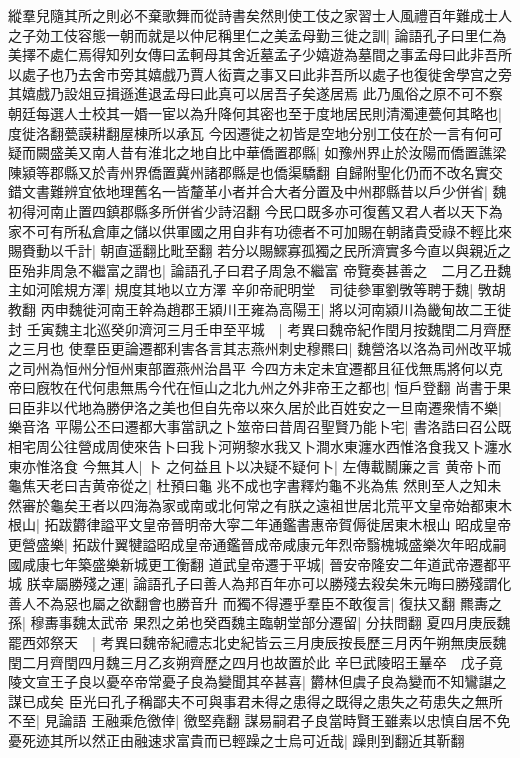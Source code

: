 縱羣兒隨其所之則必不棄歌舞而從詩書矣然則使工伎之家習士人風禮百年難成士人之子効工伎容態一朝而就是以仲尼稱里仁之美孟母勤三徙之訓|{
	論語孔子曰里仁為美擇不處仁焉得知列女傳曰孟軻母其舍近墓孟子少嬉遊為墓間之事孟母曰此非吾所以處子也乃去舍市旁其嬉戲乃賈人衒賣之事又曰此非吾所以處子也復徙舍學宫之旁其嬉戲乃設俎豆揖遜進退孟母曰此真可以居吾子矣遂居焉}
此乃風俗之原不可不察朝廷每選人士校其一㛰一宦以為升降何其密也至于度地居民則清濁連甍何其略也|{
	度徙洛翻甍謨耕翻屋棟所以承瓦}
今因遷徙之初皆是空地分别工伎在於一言有何可疑而闕盛美又南人昔有淮北之地自比中華僑置郡縣|{
	如豫州界止於汝陽而僑置譙梁陳潁等郡縣又於青州界僑置冀州諸郡縣是也僑渠驕翻}
自歸附聖化仍而不改名實交錯文書難辨宜依地理舊名一皆釐革小者并合大者分置及中州郡縣昔以戶少併省|{
	魏初得河南止置四鎮郡縣多所併省少詩沼翻}
今民口既多亦可復舊又君人者以天下為家不可有所私倉庫之儲以供軍國之用自非有功德者不可加賜在朝諸貴受祿不輕比來賜賚動以千計|{
	朝直遥翻比毗至翻}
若分以賜鰥寡孤獨之民所濟實多今直以與親近之臣殆非周急不繼富之謂也|{
	論語孔子曰君子周急不繼富}
帝覽奏甚善之　二月乙丑魏主如河隂規方澤|{
	規度其地以立方澤}
辛卯帝祀明堂　司徒參軍劉斆等聘于魏|{
	斆胡教翻}
丙申魏徙河南王幹為趙郡王潁川王雍為高陽王|{
	將以河南潁川為畿甸故二王徙封}
壬寅魏主北巡癸卯濟河三月壬申至平城　|{
	考異曰魏帝紀作閏月按魏閏二月齊歷之三月也}
使羣臣更論遷都利害各言其志燕州刺史穆羆曰|{
	魏營洛以洛為司州改平城之司州為恒州分恒州東部置燕州治昌平}
今四方未定未宜遷都且征伐無馬將何以克帝曰廐牧在代何患無馬今代在恒山之北九州之外非帝王之都也|{
	恒戶登翻}
尚書于果曰臣非以代地為勝伊洛之美也但自先帝以來久居於此百姓安之一旦南遷衆情不樂|{
	樂音洛}
平陽公丕曰遷都大事當訊之卜筮帝曰昔周召聖賢乃能卜宅|{
	書洛誥曰召公既相宅周公往營成周使來告卜曰我卜河朔黎水我又卜澗水東瀍水西惟洛食我又卜瀍水東亦惟洛食}
今無其人|{
	卜}
之何益且卜以决疑不疑何卜|{
	左傳載鬭廉之言}
黄帝卜而龜焦天老曰吉黄帝從之|{
	杜預曰龜兆不成也字書釋灼龜不兆為焦}
然則至人之知未然審於龜矣王者以四海為家或南或北何常之有朕之遠祖世居北荒平文皇帝始都東木根山|{
	拓跋欝律謚平文皇帝晉明帝大寜二年通鑑書惠帝賀傉徙居東木根山}
昭成皇帝更營盛樂|{
	拓跋什翼犍謚昭成皇帝通鑑晉成帝咸康元年烈帝翳槐城盛樂次年昭成嗣國咸康七年築盛樂新城更工衡翻}
道武皇帝遷于平城|{
	晉安帝隆安二年道武帝遷都平城}
朕幸屬勝殘之運|{
	論語孔子曰善人為邦百年亦可以勝殘去殺矣朱元晦曰勝殘謂化善人不為惡也屬之欲翻會也勝音升}
而獨不得遷乎羣臣不敢復言|{
	復扶又翻}
羆夀之孫|{
	穆夀事魏太武帝}
果烈之弟也癸酉魏主臨朝堂部分遷留|{
	分扶問翻}
夏四月庚辰魏罷西郊祭天　|{
	考異曰魏帝紀禮志北史紀皆云三月庚辰按長歷三月丙午朔無庚辰魏閏二月齊閏四月魏三月乙亥朔齊歷之四月也故置於此}
辛巳武陵昭王曅卒　戊子竟陵文宣王子良以憂卒帝常憂子良為變聞其卒甚喜|{
	欝林但虞子良為變而不知鸞諶之謀已成矣}
臣光曰孔子稱鄙夫不可與事君未得之患得之既得之患失之苟患失之無所不至|{
	見論語}
王融乘危徼倖|{
	徼堅堯翻}
謀易嗣君子良當時賢王雖素以忠慎自居不免憂死迹其所以然正由融速求富貴而已輕躁之士烏可近哉|{
	躁則到翻近其靳翻}


